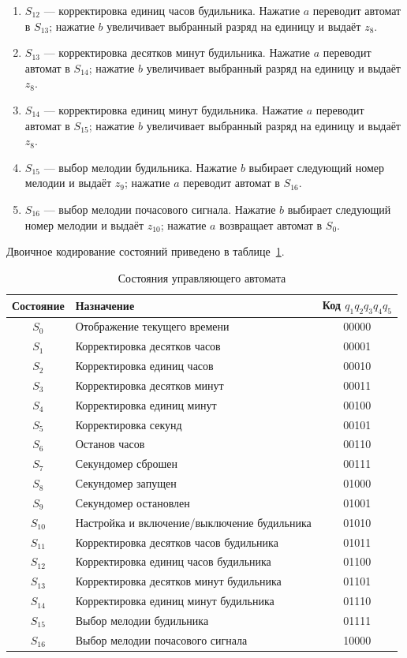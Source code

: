 \begin{enumerate}
    \item $S_{12}$ --- корректировка единиц часов будильника. Нажатие $a$ переводит автомат в $S_{13}$; нажатие $b$ увеличивает выбранный разряд на единицу и выдаёт $z_8$.
    \item $S_{13}$ --- корректировка десятков минут будильника. Нажатие $a$ переводит автомат в $S_{14}$; нажатие $b$ увеличивает выбранный разряд на единицу и выдаёт $z_8$.
    \item $S_{14}$ --- корректировка единиц минут будильника. Нажатие $a$ переводит автомат в $S_{15}$; нажатие $b$ увеличивает выбранный разряд на единицу и выдаёт $z_8$.
    \item $S_{15}$ --- выбор мелодии будильника. Нажатие $b$ выбирает следующий номер мелодии и выдаёт $z_9$; нажатие $a$ переводит автомат в $S_{16}$.
    \item $S_{16}$ --- выбор мелодии почасового сигнала. Нажатие $b$ выбирает следующий номер мелодии и выдаёт $z_{10}$; нажатие $a$ возвращает автомат в $S_0$.
\end{enumerate}

Двоичное кодирование состояний приведено в таблице~\ref{tab:states}.

\begin{table}[ht]
\centering
\caption{Состояния управляющего автомата}
\label{tab:states}
\small
\begin{tabular}{|c|p{8cm}|c|}
\hline
Состояние & Назначение & Код $q_1q_2q_3q_4q_5$ \\
\hline
$S_0$  & Отображение текущего времени & 00000 \\
$S_1$  & Корректировка десятков часов & 00001 \\
$S_2$  & Корректировка единиц часов & 00010 \\
$S_3$  & Корректировка десятков минут & 00011 \\
$S_4$  & Корректировка единиц минут & 00100 \\
$S_5$  & Корректировка секунд & 00101 \\
$S_6$  & Останов часов & 00110 \\
$S_7$  & Секундомер сброшен & 00111 \\
$S_8$  & Секундомер запущен & 01000 \\
$S_9$  & Секундомер остановлен & 01001 \\
$S_{10}$ & Настройка и включение/выключение будильника & 01010 \\
$S_{11}$ & Корректировка десятков часов будильника & 01011 \\
$S_{12}$ & Корректировка единиц часов будильника & 01100 \\
$S_{13}$ & Корректировка десятков минут будильника & 01101 \\
$S_{14}$ & Корректировка единиц минут будильника & 01110 \\
$S_{15}$ & Выбор мелодии будильника & 01111 \\
$S_{16}$ & Выбор мелодии почасового сигнала & 10000 \\
\hline
\end{tabular}
\end{table}


